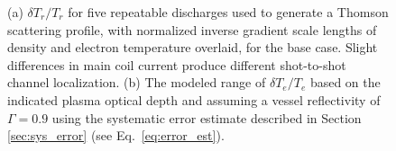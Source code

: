 \documentclass[%
 aip,
 amsmath,amssymb,
 reprint,%
]{revtex4-1}
\begin{document}
\begin{figure}[!htbp]
\centering
\begin{subfigure}[]{0.45\textwidth}
  \centering
\end{subfigure}
\hfill
\begin{subfigure}[]{0.45\textwidth}
  \centering
\end{subfigure}

\caption{(a) $\delta T_r /T_r$ for five repeatable discharges used to generate a Thomson scattering profile, with normalized inverse gradient scale lengths of density and electron temperature overlaid, for the base case. Slight differences in main coil current produce different shot-to-shot channel localization. (b) The modeled range of $\delta T_e/T_e$  based on the indicated plasma optical depth and assuming a vessel reflectivity of $\Gamma=0.9$ using the systematic error estimate described in Section \ref{sec:sys_error} (see Eq.\ \eqref{eq:error_est}).}
\label{fig:base_case_summary}
\end{figure}
\end{document}

